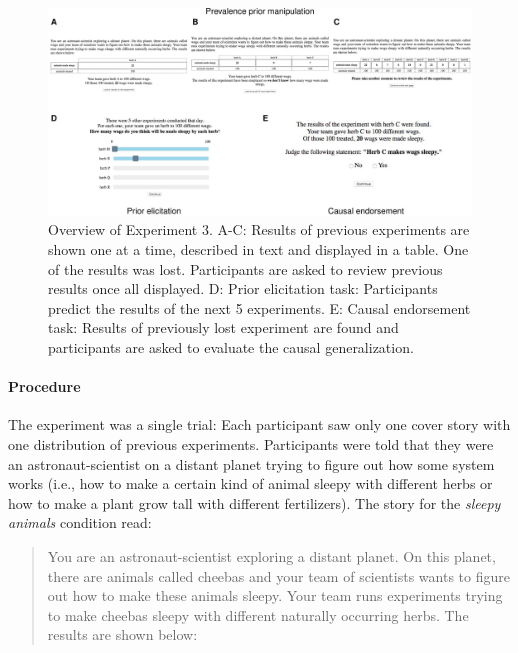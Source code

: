 \documentclass[english,,man,floatsintext]{apa6}
\let\oldparagraph\paragraph
\renewcommand{\paragraph}[1]{\oldparagraph{#1}\mbox{}}
\theoremstyle{definition}
\theoremstyle{definition}
\theoremstyle{definition}
\theoremstyle{remark}
\begin{document}
\begin{figure}[!h]
\includegraphics[width=\textwidth]{figs/causalExpt-1} \caption{Overview of Experiment 3. A-C: Results of previous experiments are shown one at a time, described in text and displayed in a table. One of the results was lost. Participants are asked to review previous results once all displayed. D: Prior elicitation task: Participants predict the results of the next 5 experiments. E: Causal endorsement task: Results of previously lost experiment are found and participants are asked to evaluate the causal generalization.}\label{fig:causalExpt}
\end{figure}

\hypertarget{procedure-3}{%
\paragraph{Procedure}\label{procedure-3}}

The experiment was a single trial: Each participant saw only one cover
story with one distribution of previous experiments. Participants were
told that they were an astronaut-scientist on a distant planet trying to
figure out how some system works (i.e., how to make a certain kind of
animal sleepy with different herbs or how to make a plant grow tall with
different fertilizers). The story for the \emph{sleepy animals}
condition read:

\begin{quotation}
You are an astronaut-scientist exploring a distant planet. 
On this planet, there are animals called cheebas and your team of scientists wants to figure out how to make these animals sleepy.
Your team runs experiments trying to make cheebas sleepy with different naturally occurring herbs.
The results are shown below:
\end{quotation}
\end{document}
